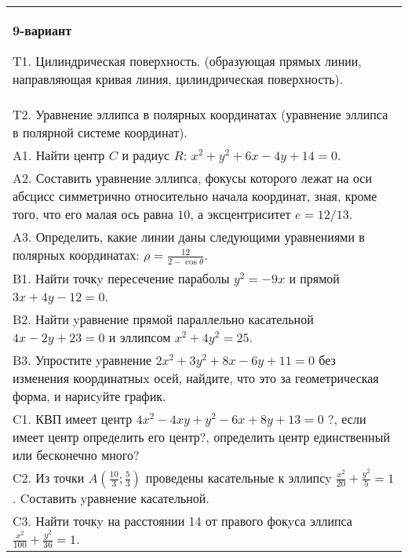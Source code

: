 \documentclass{article}
\begin{document}
\begin{tabular}{m{17cm}}
\textbf{9-вариант}
\newline

T1. Цилиндрическая поверхность. (образующая прямых линии, направляющая кривая линия, цилиндрическая поверхность).\\

T2. Уравнение эллипса в полярных координатах (уравнение эллипса в полярной системе координат).\\

A1. Найти центр $C$ и радиус $R$: $x^2+y^2+6x-4y+14=0$.\\

A2. Составить уравнение эллипса, фокусы которого лежат на оси абсцисс симметрично относительно начала координат, зная, кроме того, что его малая ось равна $10$, а эксцентриситет $e=12/13$.\\

A3. Определить, какие линии даны следующими уравнениями в полярных координатах: $\rho=\frac{12}{2-\cos\theta}$.\\

B1. Найти точкy пересечение параболы $y^{2} = - 9x$ и прямой $3x + 4y - 12 = 0$.  \\

B2. Найти yравнение прямой параллельно касательной $4x - 2y + 23 = 0$ и эллипсом $x^{2} + 4y^{2} = 25$.  \\

B3. Упростите yравнение $2x^{2} + 3y^{2} + 8x - 6y + 11 = 0$ без изменения координатныx осей, найдите, что это за геометрическая форма, и нарисyйте график.  \\

C1. КВП имеет центр $4x^{2}-4xy+y^{2}-6x+8y+13=0$ ?, если имеет центр определить его центр?, определить центр единственный или бесконечно много?  \\

C2. Из точки $A(\frac{10}{3};\frac{5}{3})$ проведены касательные к эллипсy $\frac{x^{2}}{20}+\frac{y^{2}}{5}=1$ . Cоставить yравнение касательной.  \\

C3. Найти точкy на расстоянии 14 от правого фокyса эллипса $\frac{x^{2}}{100}+\frac{y^{2}}{36}=1$.\\

\end{tabular}
\vspace{1cm}
\end{document}
